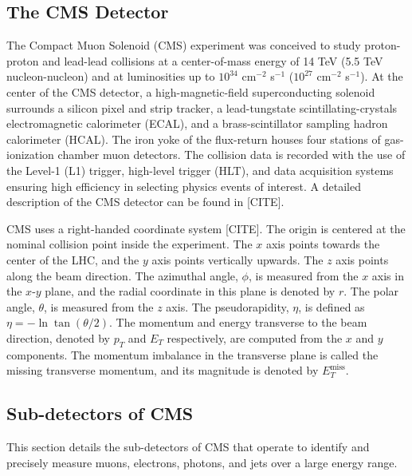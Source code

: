 \documentclass{article}
\begin{document}
\subsection{The CMS Detector}
The Compact Muon Solenoid (CMS) experiment was conceived to study proton-proton and lead-lead collisions at a center-of-mass energy of 14 TeV (5.5 TeV nucleon-nucleon) and at luminosities up to $10^{34}$ cm$^{-2}$ s$^{-1}$ ($10^{27}$ cm$^{-2}$ s$^{-1}$). At the center of the CMS detector, a high-magnetic-field superconducting solenoid surrounds a silicon pixel and strip tracker, a lead-tungstate scintillating-crystals electromagnetic calorimeter (ECAL), and a brass-scintillator sampling hadron calorimeter (HCAL). The iron yoke of the flux-return houses four stations of gas-ionization chamber muon detectors. The collision data is recorded with the use of the Level-1 (L1) trigger, high-level trigger (HLT), and data acquisition systems ensuring high efficiency in selecting physics events of interest. A detailed description of the CMS detector can be found in [CITE].

CMS uses a right-handed coordinate system [CITE]. The origin is centered at the nominal collision point inside the experiment. The $x$ axis points towards the center of the LHC, and the $y$ axis points vertically upwards. The $z$ axis points along the beam direction. The azimuthal angle, $\phi$, is measured from the $x$ axis in the $x$-$y$ plane, and the radial coordinate in this plane is denoted by $r$. The polar angle, $\theta$, is measured from the $z$ axis. The pseudorapidity, $\eta$, is defined as $\eta = -\ln \tan(\theta/2)$. The momentum and energy transverse to the beam direction, denoted by $p_{T}$ and $E_{T}$ respectively, are computed from the $x$ and $y$ components. The momentum imbalance in the transverse plane is called the missing transverse momentum, and its magnitude is denoted by $E_{T}^{\text{miss}}$.

\subsection{Sub-detectors of CMS}
This section details the sub-detectors of CMS that operate to identify and precisely measure muons, electrons, photons, and jets over a large energy range. 
\end{document}
